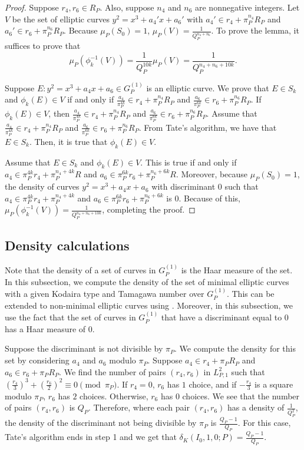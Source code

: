 \documentclass[12pt,letterpaper]{amsart}
\theoremstyle{definition}
\begin{document}
\begin{proof}
Suppose $r_4, r_6\in R_P$. Also, suppose $n_4$ and $n_6$ are nonnegative integers. Let $V$ be the set of elliptic curves $y^2=x^3+a_4'x+a_6'$ with $a_4'\in r_4+\pi_P^{n_4}R_P$ and $a_6'\in r_6+\pi_P^{n_6}R_P$. Because $\mu_P(S_0)=1$, $\mu_P(V)=\frac{1}{Q_P^{n_4+n_6}}$. To prove the lemma, it suffices to prove that 
\[
\mu_P(\phi_k^{-1}(V))=\frac{1}{Q_P^{10k}}\mu_P(V)=\frac{1}{Q_P^{n_4+n_6+10k}}.
\]

Suppose $E:y^2=x^3+a_4x+a_6\in G_P^{(1)}$ is an elliptic curve. We prove that $E\in S_k$ and $\phi_k(E)\in V$ if and only if $\frac{a_4}{\pi_P^{4k}}\in r_4+\pi_P^{n_4}R_P$ and $\frac{a_6}{\pi_P^{6k}}\in r_6+\pi_P^{n_6}R_P$. If $\phi_k(E)\in V$, then $\frac{a_4}{\pi_P^{4k}}\in r_4+\pi_P^{n_4}R_P$ and $\frac{a_6}{\pi_P^{6k}}\in r_6+\pi_P^{n_6}R_P$. Assume that $\frac{a_4}{\pi_P^{4k}}\in r_4+\pi_P^{n_4}R_P$ and $\frac{a_6}{\pi_P^{6k}}\in r_6+\pi_P^{n_6}R_P$. From Tate's algorithm, we have that $E\in S_k$. Then, it is true that $\phi_k(E)\in V$.

Assume that $E\in S_k$ and $\phi_k(E)\in V$. This is true if and only if $a_4\in \pi_P^{4k}r_4+\pi_P^{n_4+4k}R$ and $a_6\in \pi_P^{6k}r_6+\pi_P^{n_6+6k}R$. Moreover, because $\mu_P(S_0)=1$, the density of curves $y^2=x^3+a_4x+a_6$ with discriminant $0$ such that $a_4\in \pi_P^{4k}r_4+\pi_P^{n_4+4k}$ and $a_6\in \pi_P^{6k}r_6+\pi_P^{n_6+6k}$ is $0$. Because of this, $\mu_P(\phi_k^{-1}(V))=\frac{1}{Q_P^{n_4+n_6+10k}}$, completing the proof.
\end{proof}

\subsection{Density calculations}

Note that the density of a set of curves in $G_P^{(1)}$ is the Haar measure of the set. In this subsection, we compute the density of the set of minimal elliptic curves with a given Kodaira type and Tamagawa number over $G_P^{(1)}$. This can be extended to non-minimal elliptic curves using . Moreover, in this subsection, we use the fact that the set of curves in $G_P^{(1)}$ that have a discriminant equal to $0$ has a Haar measure of $0$.

Suppose the discriminant is not divisible by $\pi_P$. We compute the density for this set by considering $a_4$ and $a_6$ modulo $\pi_P$. Suppose $a_4\in r_4+\pi_PR_P$ and $a_6\in r_6+\pi_PR_P$. We find the number of pairs $(r_4, r_6)$ in $L_{P,1}^2$ such that $\left(\frac{r_4}{3}\right)^3+\left(\frac{r_6}{2}\right)^2\equiv 0\pmod{\pi_P}$. If $r_4=0$, $r_6$ has $1$ choice, and if $-\frac{r_4}{3}$ is a square modulo $\pi_P$, $r_6$ has $2$ choices. Otherwise, $r_6$ has $0$ choices. We see that the number of pairs $(r_4, r_6)$ is $Q_P$. Therefore, where each pair $(r_4, r_6)$ has a density of $\frac{1}{Q_P^2}$, the density of the discriminant not being divisible by $\pi_P$ is $\frac{Q_P-1}{Q_P}$. For this case, Tate's algorithm ends in step 1 and we get that $\delta_K(I_0,1,0; P)=\frac{Q_P-1}{Q_P}$.
\end{document}

